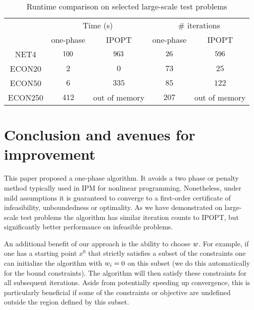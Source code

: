 \documentclass{article}
\begin{document}
\begin{table}[H]
\begin{tabular}{|c| c c | c c |}
  \hline
  \multirow{2}{*}{} 
      & \multicolumn{2}{c|}{Time (s)} 
          & \multicolumn{2}{|c|}{\# iterations} \\             \cline{2-5}
  & one-phase & IPOPT & one-phase & IPOPT \\  \hline
  NET4 & $100$ & $963$  & $26$   & $596$ \\      \hline
    ECON20 & $2$  & $0$  & $73$ & $25$   \\      \hline
  ECON50 & $6$  & $335$  & $85$ & $122$   \\      \hline
  ECON250 & $412$  &  out of memory & $207$ & out of memory \\      \hline
\end{tabular}
\caption{Runtime comparison on selected large-scale test problems}\label{compare-runtime}
\end{table}

\section{Conclusion and avenues for improvement}

This paper proposed a one-phase algorithm. It avoids a two phase or penalty method typically used in IPM for nonlinear programming. Nonetheless, under mild assumptions it is guaranteed to converge to a first-order certificate of infeasibility, unboundedness or optimality. As we have demonstrated on large-scale test problems the algorithm has similar iteration counts to IPOPT, but significantly better performance on infeasible problems. 

An additional benefit of our approach is the ability to choose $w$. For example, if one has a starting point $x^0$ that strictly satisfies a subset of the constraints one can initialize the algorithm with $w_i = 0$ on this subset (we do this automatically for the bound constraints). The algorithm will then satisfy these constraints for all subsequent iterations. Aside from potentially speeding up convergence, this is particularly beneficial if some of the constraints or objective are undefined outside the region defined by this subset.
\end{document}
